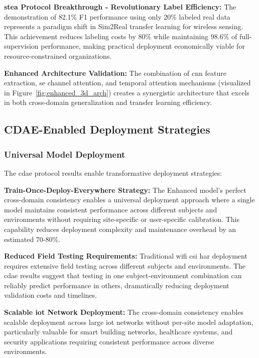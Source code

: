 \documentclass[journal]{IEEEtran}
\begin{document}
\textbf{\gls{stea} Protocol Breakthrough - Revolutionary Label Efficiency:} The demonstration of 82.1\% F1 performance using only 20\% labeled real data represents a paradigm shift in Sim2Real transfer learning for wireless sensing. This achievement reduces labeling costs by 80\% while maintaining 98.6\% of full-supervision performance, making practical deployment economically viable for resource-constrained organizations.

\textbf{Enhanced Architecture Validation:} The combination of \gls{cnn} feature extraction, \gls{se} channel attention, and temporal attention mechanisms (visualized in Figure~\ref{fig:enhanced_3d_arch}) creates a synergistic architecture that excels in both cross-domain generalization and transfer learning efficiency.

\subsection{CDAE-Enabled Deployment Strategies}

\subsubsection{Universal Model Deployment}

The \gls{cdae} protocol results enable transformative deployment strategies:

\textbf{Train-Once-Deploy-Everywhere Strategy:} The Enhanced model's perfect cross-domain consistency enables a universal deployment approach where a single model maintains consistent performance across different subjects and environments without requiring site-specific or user-specific calibration. This capability reduces deployment complexity and maintenance overhead by an estimated 70-80\%.

\textbf{Reduced Field Testing Requirements:} Traditional \gls{wifi} \gls{csi} \gls{har} deployment requires extensive field testing across different subjects and environments. The \gls{cdae} results suggest that testing in one subject-environment combination can reliably predict performance in others, dramatically reducing deployment validation costs and timelines.

\textbf{Scalable \gls{iot} Network Deployment:} The cross-domain consistency enables scalable deployment across large \gls{iot} networks without per-site model adaptation, particularly valuable for smart building networks, healthcare systems, and security applications requiring consistent performance across diverse environments.
\end{document}
